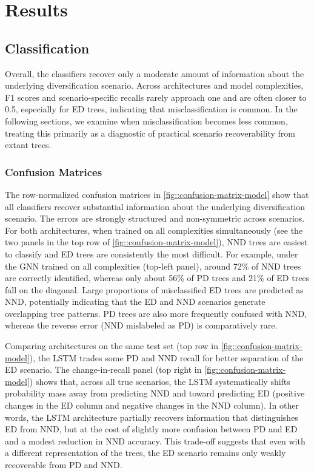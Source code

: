 {\section{Results}
\label{ch3::sec::results}
\subsection{Classification}
\label{ch3::sec::results::classification}
Overall, the classifiers recover only a moderate amount of information about the underlying diversification scenario. Across architectures and model complexities, F1 scores and scenario-specific recalls rarely approach one and are often closer to 0.5, especially for ED trees, indicating that misclassification is common. In the following sections, we examine when misclassification becomes less common, treating this primarily as a diagnostic of practical scenario recoverability from extant trees.

\subsubsection{Confusion Matrices}
\label{ch3::sec::results::classification::confusion-matrices}
The row-normalized confusion matrices in \autoref{fig::confusion-matrix-model} show that all classifiers recover substantial information about the underlying diversification scenario. The errors are strongly structured and non-symmetric across scenarios. For both architectures, when trained on all complexities simultaneously (see the two panels in the top row of \autoref{fig::confusion-matrix-model}), NND trees are easiest to classify and ED trees are consistently the most difficult. For example, under the GNN trained on all complexities (top-left panel), around 72\% of NND trees are correctly identified, whereas only about 56\% of PD trees and 21\% of ED trees fall on the diagonal. Large proportions of misclassified ED trees are predicted as NND, potentially indicating that the ED and NND scenarios generate overlapping tree patterns. PD trees are also more frequently confused with NND, whereas the reverse error (NND mislabeled as PD) is comparatively rare.

Comparing architectures on the same test set (top row in \autoref{fig::confusion-matrix-model}), the LSTM trades some PD and NND recall for better separation of the ED scenario. The change-in-recall panel (top right in \autoref{fig::confusion-matrix-model}) shows that, across all true scenarios, the LSTM systematically shifts probability mass away from predicting NND and toward predicting ED (positive changes in the ED column and negative changes in the NND column). In other words, the LSTM architecture partially recovers information that distinguishes ED from NND, but at the cost of slightly more confusion between PD and ED and a modest reduction in NND accuracy. This trade-off suggests that even with a different representation of the trees, the ED scenario remains only weakly recoverable from PD and NND.

}
